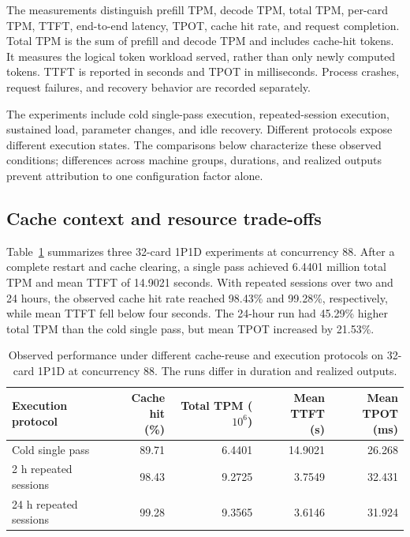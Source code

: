 \documentclass[preprint,12pt]{elsarticle}
\begin{document}
The measurements distinguish prefill TPM, decode TPM, total TPM, per-card TPM, TTFT, end-to-end latency, TPOT, cache hit rate, and request completion. Total TPM is the sum of prefill and decode TPM and includes cache-hit tokens. It measures the logical token workload served, rather than only newly computed tokens. TTFT is reported in seconds and TPOT in milliseconds. Process crashes, request failures, and recovery behavior are recorded separately.

The experiments include cold single-pass execution, repeated-session execution, sustained load, parameter changes, and idle recovery. Different protocols expose different execution states. The comparisons below characterize these observed conditions; differences across machine groups, durations, and realized outputs prevent attribution to one configuration factor alone.

\subsection{Cache context and resource trade-offs}
Table~\ref{tab:historical-cache} summarizes three 32-card 1P1D experiments at concurrency 88. After a complete restart and cache clearing, a single pass achieved 6.4401 million total TPM and mean TTFT of 14.9021 seconds. With repeated sessions over two and 24 hours, the observed cache hit rate reached 98.43\% and 99.28\%, respectively, while mean TTFT fell below four seconds. The 24-hour run had 45.29\% higher total TPM than the cold single pass, but mean TPOT increased by 21.53\%.

\begin{table}[htbp]
\centering\small
\begin{tabular}{@{}lrrrr@{}}
\toprule
Execution protocol & \shortstack{Cache hit\\(\%)} & \shortstack{Total TPM\\($10^6$)} & \shortstack{Mean TTFT\\(s)} & \shortstack{Mean TPOT\\(ms)} \\
\midrule
Cold single pass & 89.71 & 6.4401 & 14.9021 & 26.268 \\
2 h repeated sessions & 98.43 & 9.2725 & 3.7549 & 32.431 \\
24 h repeated sessions & 99.28 & 9.3565 & 3.6146 & 31.924 \\
\bottomrule
\end{tabular}
\caption{Observed performance under different cache-reuse and execution protocols on 32-card 1P1D at concurrency 88. The runs differ in duration and realized outputs.}
\label{tab:historical-cache}
\end{table}
\end{document}
